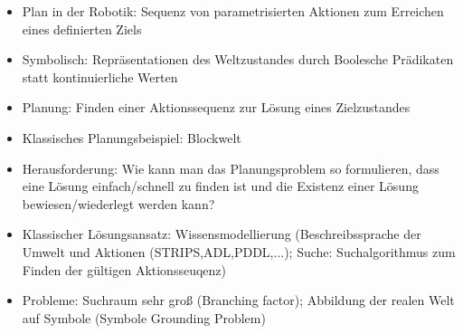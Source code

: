 \documentclass[paper=a4, fontsize=11pt]{scrartcl} %
\numberwithin{equation}{section} %
\numberwithin{figure}{section} %
\numberwithin{table}{section} %
\begin{document}
\begin{itemize}
\item Plan in der Robotik: Sequenz von parametrisierten Aktionen zum Erreichen eines definierten Ziels
\item Symbolisch: Repräsentationen des Weltzustandes durch Boolesche Prädikaten statt kontinuierliche Werten
\item Planung: Finden einer Aktionssequenz zur Lösung eines Zielzustandes
\item Klassisches Planungsbeispiel: Blockwelt
\item Herausforderung: Wie kann man das Planungsproblem so formulieren, dass eine Lösung einfach/schnell zu finden ist und die Existenz einer Lösung bewiesen/wiederlegt werden kann?
\item Klassischer Lösungsansatz: Wissensmodellierung (Beschreibssprache der Umwelt und Aktionen (STRIPS,ADL,PDDL,...); Suche: Suchalgorithmus zum Finden der gültigen Aktionsseuqenz)
\item Probleme: Suchraum sehr groß (Branching factor); Abbildung der realen Welt auf Symbole (Symbole Grounding Problem)
\end{itemize}
\end{document}

